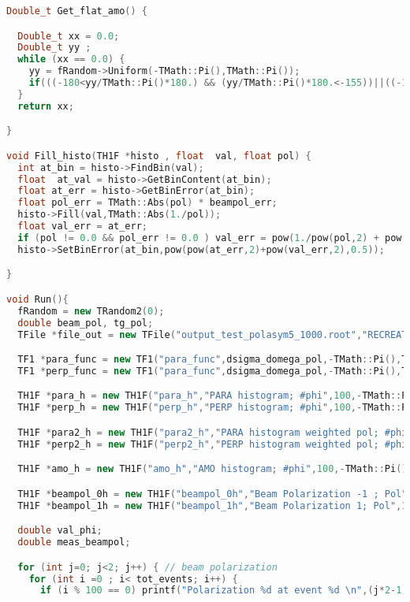 \begin{lstlisting}[language=C++]
Double_t Get_flat_amo() {

  Double_t xx = 0.0;
  Double_t yy ;
  while (xx == 0.0) {
    yy = fRandom->Uniform(-TMath::Pi(),TMath::Pi());
    if(((-180<yy/TMath::Pi()*180.) && (yy/TMath::Pi()*180.<-155))||((-145<yy/TMath::Pi()*180.)&&(yy/TMath::Pi()*180.<-95))||((-85<yy/TMath::Pi()*180.)&&(yy/TMath::Pi()*180.<-35))||((-25<yy/TMath::Pi()*180.)&&(yy/TMath::Pi()*180.<25))||((35<yy/TMath::Pi()*180.)&&(yy/TMath::Pi()*180.<85))||((95<yy/TMath::Pi()*180.)&&(yy/TMath::Pi()*180.<145))||((155<yy/TMath::Pi()*180.)&&(yy/TMath::Pi()*180.<180))) xx = yy; 
  }
  return xx;

}

void Fill_histo(TH1F *histo , float  val, float pol) {
  int at_bin = histo->FindBin(val);
  float  at_val = histo->GetBinContent(at_bin);
  float at_err = histo->GetBinError(at_bin);
  float pol_err = TMath::Abs(pol) * beampol_err;
  histo->Fill(val,TMath::Abs(1./pol));
  float val_err = at_err;
  if (pol != 0.0 && pol_err != 0.0 ) val_err = pow(1./pow(pol,2) + pow(pol_err,2)/pow(pol,4),0.5);
  histo->SetBinError(at_bin,pow(pow(at_err,2)+pow(val_err,2),0.5));

}

void Run(){
  fRandom = new TRandom2(0);
  double beam_pol, tg_pol;
  TFile *file_out = new TFile("output_test_polasym5_1000.root","RECREATE");

  TF1 *para_func = new TF1("para_func",dsigma_domega_pol,-TMath::Pi(),TMath::Pi(),5);
  TF1 *perp_func = new TF1("para_func",dsigma_domega_pol,-TMath::Pi(),TMath::Pi(),5);

  TH1F *para_h = new TH1F("para_h","PARA histogram; #phi",100,-TMath::Pi(),TMath::Pi());
  TH1F *perp_h = new TH1F("perp_h","PERP histogram; #phi",100,-TMath::Pi(),TMath::Pi());

  TH1F *para2_h = new TH1F("para2_h","PARA histogram weighted pol; #phi",100,-TMath::Pi(),TMath::Pi());
  TH1F *perp2_h = new TH1F("perp2_h","PERP histogram weighted pol; #phi",100,-TMath::Pi(),TMath::Pi());

  TH1F *amo_h = new TH1F("amo_h","AMO histogram; #phi",100,-TMath::Pi(),TMath::Pi());

  TH1F *beampol_0h = new TH1F("beampol_0h","Beam Polarization -1 ; Pol",100,0.,1.0);
  TH1F *beampol_1h = new TH1F("beampol_1h","Beam Polarization 1; Pol",100,0.,1.0);

  double val_phi;
  double meas_beampol;

  for (int j=0; j<2; j++) { // beam polarization
    for (int i =0 ; i< tot_events; i++) {
      if (i % 100 == 0) printf("Polarization %d at event %d \n",(j*2-1),i);


\end{lstlisting}
